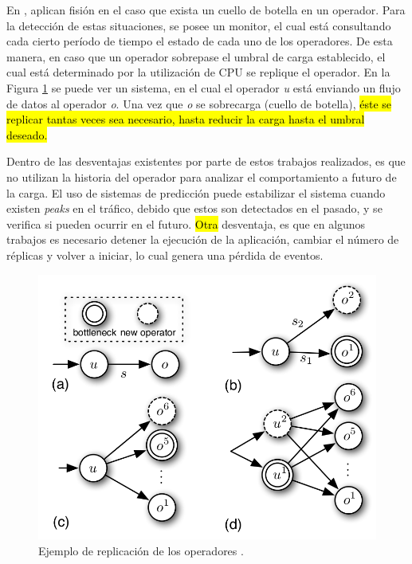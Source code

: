 En \citep{FernandezMKP13}, aplican fisión en el caso que exista un cuello de botella en un operador. Para la detección de estas situaciones, se posee un monitor, el cual está consultando cada cierto período de tiempo el estado de cada uno de los operadores. De esta manera, en caso que un operador sobrepase el umbral de carga establecido, el cual está determinado por la utilización de CPU se replique el operador. En la Figura \ref{fig:ejFision} se puede ver un sistema, en el cual el operador \textit{u} está enviando un flujo de datos al operador \textit{o}. Una vez que \textit{o} se sobrecarga (cuello de botella),\hl{ éste se replicar tantas veces sea necesario, hasta reducir la carga hasta el umbral deseado.}

Dentro de las desventajas existentes por parte de estos trabajos realizados, es que no utilizan la historia del operador para analizar el comportamiento a futuro de la carga. El uso de sistemas de predicción puede estabilizar el sistema cuando existen \textit{peaks} en el tráfico, debido que estos son detectados en el pasado, y se verifica si pueden ocurrir en el futuro. \hl{Otra} desventaja, es que en algunos trabajos es necesario detener la ejecución de la aplicación, cambiar el número de réplicas y volver a iniciar, lo cual genera una pérdida de eventos.

\begin{figure}[!ht]
	\centering
	\includegraphics[scale=0.3]{images/EjFision.png}
	\caption{Ejemplo de replicación de los operadores \citep{FernandezMKP13}.}
	\label{fig:ejFision}
\end{figure}

\vspace*{15cm}